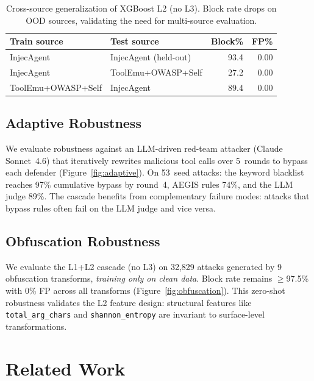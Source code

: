 \documentclass[sigconf]{acmart}
\begin{document}
\begin{table}[t]
\centering\small
\caption{Cross-source generalization of XGBoost L2 (no L3). Block rate drops on OOD sources, validating the need for multi-source evaluation.}
\vspace{-0.1in}
\label{tab:xsource}
\begin{tabular}{llrr}
\toprule
Train source & Test source & Block\% & FP\% \\
\midrule
InjecAgent & InjecAgent (held-out) & 93.4 & 0.00 \\
InjecAgent & ToolEmu+OWASP+Self & 27.2 & 0.00 \\
ToolEmu+OWASP+Self & InjecAgent & 89.4 & 0.00 \\
\bottomrule
\end{tabular}
\vspace{-0.1in}
\end{table}

\subsection{Adaptive Robustness}

We evaluate robustness against an LLM-driven red-team attacker (Claude Sonnet~4.6) that iteratively rewrites malicious tool calls over 5~rounds to bypass each defender (Figure~\ref{fig:adaptive}).
On 53~seed attacks: the keyword blacklist reaches 97\% cumulative bypass by round~4, AEGIS rules 74\%, and the LLM judge 89\%.
The cascade benefits from complementary failure modes: attacks that bypass rules often fail on the LLM judge and vice versa.

\subsection{Obfuscation Robustness}

We evaluate the L1+L2 cascade (no L3) on 32{,}829 attacks generated by 9 obfuscation transforms, \emph{training only on clean data}.
Block rate remains $\ge$97.5\% with 0\% FP across all transforms (Figure~\ref{fig:obfuscation}).
This zero-shot robustness validates the L2 feature design: structural features like \texttt{total\_arg\_chars} and \texttt{shannon\_entropy} are invariant to surface-level transformations.

\section{Related Work}
\label{sec:related}
\end{document}
